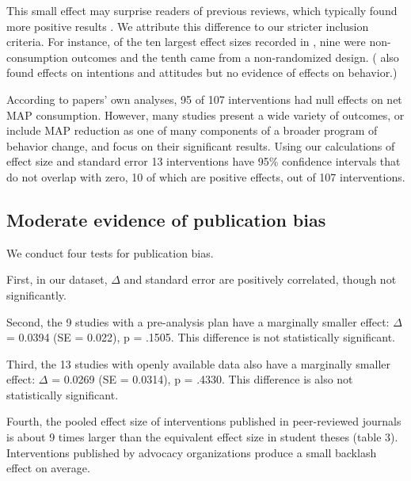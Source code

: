 \documentclass[sn-nature,pdflatex]{sn-jnl}
\begin{document}
This small effect may surprise readers of previous reviews, which
typically found more positive results
\citep{mathur2021meta, meier2022, chang2023}. We attribute this
difference to our stricter inclusion criteria. For instance, of the ten
largest effect sizes recorded in \citep{mathur2021effectiveness}, nine
were non-consumption outcomes and the tenth came from a non-randomized
design. (\citep{bianchi2018conscious} also found effects on intentions
and attitudes but no evidence of effects on behavior.)

According to papers' own analyses, 95 of 107 interventions had null
effects on net MAP consumption. However, many studies present a wide
variety of outcomes, or include MAP reduction as one of many components
of a broader program of behavior change, and focus on their significant
results. Using our calculations of effect size and standard error 13
interventions have 95\% confidence intervals that do not overlap with
zero, 10 of which are positive effects, out of 107 interventions.

\subsection{Moderate evidence of publication bias}\label{sec2.3}

We conduct four tests for publication bias.

\begin{comment} 
introductory remarks about how this puts our main results in one light or another? 
\end{comment}

First, in our dataset, \(\Delta\) and standard error are positively
correlated, though not significantly.

\begin{comment} 
good place for a figure?
\end{comment}

Second, the 9 studies with a pre-analysis plan have a marginally smaller
effect: \(\Delta\) = 0.0394 (SE = 0.022), p = .1505. This difference is
not statistically significant.

Third, the 13 studies with openly available data also have a marginally
smaller effect: \(\Delta\) = 0.0269 (SE = 0.0314), p = .4330. This
difference is also not statistically significant.

Fourth, the pooled effect size of interventions published in
peer-reviewed journals is about 9 times larger than the equivalent
effect size in student theses (table 3). Interventions published by
advocacy organizations produce a small backlash effect on average.
\end{document}
